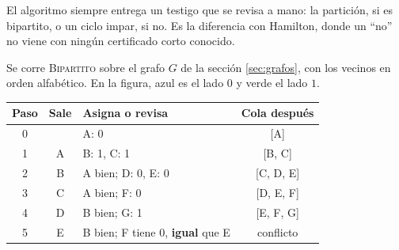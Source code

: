 \documentclass[11pt,letterpaper]{article}
\begin{document}
\begin{idea}
  El algoritmo siempre entrega un testigo que se revisa a mano: la
  partición, si es bipartito, o un ciclo impar, si no. Es la
  diferencia con Hamilton, donde un ``no'' no viene con ningún
  certificado corto conocido.
\end{idea}

\begin{ejemplo}
  \label{ej:bipartito-traza-G}
  Se corre \textsc{Bipartito} sobre el grafo $G$ de la sección
  \ref{sec:grafos}, con los vecinos en orden alfabético. En la
  figura, azul es el lado $0$ y verde el lado $1$.
  \begin{center}
  \small
  \begin{tabular}{cclc}
    \toprule
    \textbf{Paso} & \textbf{Sale} & \textbf{Asigna o revisa}
      & \textbf{Cola después} \\
    \midrule
    0 & & A: 0 & [A] \\
    1 & A & B: 1, C: 1 & [B, C] \\
    2 & B & A bien; D: 0, E: 0 & [C, D, E] \\
    3 & C & A bien; F: 0 & [D, E, F] \\
    4 & D & B bien; G: 1 & [E, F, G] \\
    5 & E & B bien; F tiene 0, \textbf{igual} que E & conflicto \\
    \bottomrule
  \end{tabular}
  \end{center}
  \begin{center}
\end{center}
\end{ejemplo}
\end{document}
